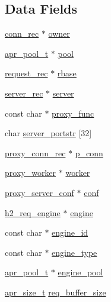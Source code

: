 \subsection*{Data Fields}
\begin{DoxyCompactItemize}
\item 
\hyperlink{structconn__rec}{conn\+\_\+rec} $\ast$ \hyperlink{structh2__proxy__ctx_a67d03e403288a6afa62c93d23e5d7d92}{owner}
\item 
\hyperlink{structapr__pool__t}{apr\+\_\+pool\+\_\+t} $\ast$ \hyperlink{structh2__proxy__ctx_abf702bd13f2823a7878304d55c76f948}{pool}
\item 
\hyperlink{structrequest__rec}{request\+\_\+rec} $\ast$ \hyperlink{structh2__proxy__ctx_aa96d57119a4a54fbcaa10fdd870075f4}{rbase}
\item 
\hyperlink{structserver__rec}{server\+\_\+rec} $\ast$ \hyperlink{structh2__proxy__ctx_a6acc4a582b17df1fb0c87ec5e1f70390}{server}
\item 
const char $\ast$ \hyperlink{structh2__proxy__ctx_ab88d3d593120fe73e73e8b4d55175e09}{proxy\+\_\+func}
\item 
char \hyperlink{structh2__proxy__ctx_a7d8e0a31ba98c520a010df3a46f08b93}{server\+\_\+portstr} \mbox{[}32\mbox{]}
\item 
\hyperlink{structproxy__conn__rec}{proxy\+\_\+conn\+\_\+rec} $\ast$ \hyperlink{structh2__proxy__ctx_ae1b7acaf2a4b71d42c8f4b9a507ff7b0}{p\+\_\+conn}
\item 
\hyperlink{structproxy__worker}{proxy\+\_\+worker} $\ast$ \hyperlink{structh2__proxy__ctx_a5174b4cd727543cff4c868fd58f36436}{worker}
\item 
\hyperlink{structproxy__server__conf}{proxy\+\_\+server\+\_\+conf} $\ast$ \hyperlink{structh2__proxy__ctx_a88b3d5b16e922c686893a68ff8d9ecad}{conf}
\item 
\hyperlink{structh2__req__engine}{h2\+\_\+req\+\_\+engine} $\ast$ \hyperlink{structh2__proxy__ctx_a140d4279a931b3a28177e94857cf0b87}{engine}
\item 
const char $\ast$ \hyperlink{structh2__proxy__ctx_aefa05b92f4d7e086bd8f3a7135e543c0}{engine\+\_\+id}
\item 
const char $\ast$ \hyperlink{structh2__proxy__ctx_a7ecc0c1f215f7adbb23c6b7fb4e38b12}{engine\+\_\+type}
\item 
\hyperlink{structapr__pool__t}{apr\+\_\+pool\+\_\+t} $\ast$ \hyperlink{structh2__proxy__ctx_a3306a95da3433a0eff695d0a7acbe33a}{engine\+\_\+pool}
\item 
\hyperlink{group__apr__platform_gaaa72b2253f6f3032cefea5712a27540e}{apr\+\_\+size\+\_\+t} \hyperlink{structh2__proxy__ctx_ace620229f78bc4cda6caa7494d13bf18}{req\+\_\+buffer\+\_\+size}

\end{DoxyCompactItemize}
